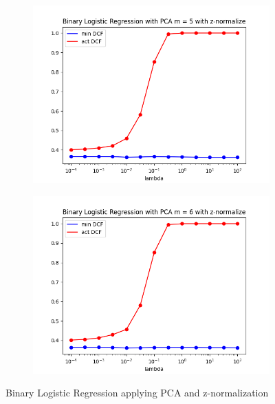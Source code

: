 \begin{figure}[h!]
    \centering
    \begin{subfigure}[b]{0.30\linewidth}
        \includegraphics[width=\linewidth]{Lab/08. Lab 08/Images/12. BLR - PCA m=5 Z-norm}
        \label{fig:BLRPCAm5ZNorm}
    \end{subfigure}
    \begin{subfigure}[b]{0.30\linewidth}
        \includegraphics[width=\linewidth]{Lab/08. Lab 08/Images/13. BLR - PCA m=6 Z-norm}
        \label{fig:BLRPCAm6ZNorm}
    \end{subfigure}
    \caption{Binary Logistic Regression applying PCA and z-normalization}
    \label{fig:BLRPCA}
\end{figure}

